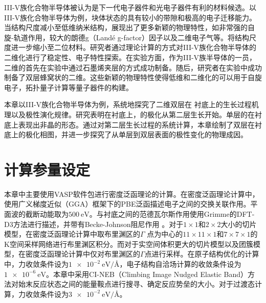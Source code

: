 III-V族化合物半导体被认为是下一代电子器件和光电子器件有利的材料候选。以III-V族化合物半导体为例，块体状态的具有较小的带隙和极高的电子迁移能力。当结构尺度减小至低维纳米结构，展现出了更多新颖的物理特性，如非常强的自旋-轨道作用，较大的朗德g（Landé g-factor）因子以及二维电子气等。将结构尺度进一步缩小至二位材料。研究者通过理论计算的方式对III-V族化合物半导体的二维化进行了稳定性、电子特性探索。在实验方面，作为III-V族半导体的一员，二维的首先在实验中通过石墨烯夹层的方式成功制备。随后，研究者在实验中成功制备了双层蜂窝状的二维。这些新颖的物理特性使得低维和二维化的可以用于自旋电子，拓扑量子计算等量子器件的构建。

本章以III-V族化合物半导体为例，系统地探究了二维双层在  衬底上的生长过程机理以及极性演化规律。研究表明在衬底上，的极化从第二层生长开始。单层的在衬底上表现出非晶的形态。通过对第二层生长过程的系统计算，本章绘制了双层在衬底上的极化相图，并进一步探究了从单层到双层表面的极性变化的物理成因。
\section{计算参量设定}
本章中主要使用VASP软件包进行密度泛函理论的计算。在密度泛函理论计算中，使用广义梯度近似（GGA）框架下的PBE泛函描述电子之间的交换关联作用。平面波的截断动能取为$\SI{500}{\electronvolt}$。与衬底之间的范德瓦尔斯作用使用Grimme的DFT-D3方法进行描述，并带有Becke-Johnson阻尼作用 。对于$1 \times 1$和$2 \times 2$大小的切片模型，在密度泛函理论计算中取布里渊区的$\Gamma$ 点为中心的$11 \times 11 \times 1$和$7 \times 7 \times 1$的K空间采样网络进行布里渊区积分。而对于实空间体积更大的切片模型以及团簇模型，在密度泛函理论计算中仅对布里渊区的$\Gamma$点进行采样。在原子结构优化的计算中，力收敛条件设为$\SI{1e-2}{\electronvolt \per \angstrom}$，电子结构自洽场计算的收敛条件设为$\SI{1e-6}{\electronvolt}$。本章中采用CI-NEB（Climbing Image Nudged Elastic Band）方法对始末反应状态之间的能量鞍点进行搜寻、确定反应势垒的大小。对于过渡态计算，力收敛条件设为$\SI{3e-2}{\electronvolt \per \angstrom}$。

